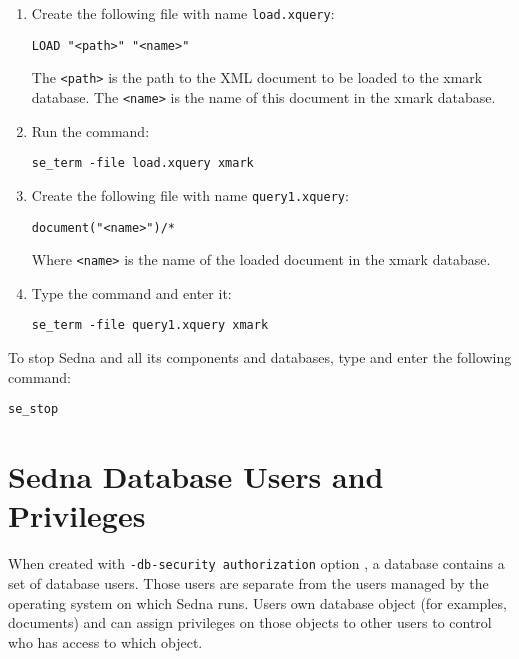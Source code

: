 \documentclass[a4paper,12pt]{article}
\begin{document}
\begin{enumerate}
\item Create the following file with name \verb!load.xquery!:

\begin{verbatim}
LOAD "<path>" "<name>"
\end{verbatim}

The \verb!<path>! is the path to the XML document to be loaded to the xmark database. The \verb!<name>! is the name of this document in the xmark database.

\item Run the command:

\begin{verbatim}
se_term -file load.xquery xmark
\end{verbatim}

\item Create the following file with name \verb!query1.xquery!:

\begin{verbatim}
document("<name>")/*
\end{verbatim}

Where \verb!<name>! is the name of the loaded document in the xmark database.

\item Type the command and enter it:
\begin{verbatim}
se_term -file query1.xquery xmark
\end{verbatim}
\end{enumerate}

To stop Sedna and all its components and databases, type and enter the following command:

\begin{verbatim}
se_stop
\end{verbatim}



%
%
%
%
\section{Sedna Database Users and Privileges}

When created with \verb!-db-security authorization! option , a database contains a set of database users. Those users are separate from the users managed by the operating system on which Sedna runs. Users own database object (for examples, documents) and can assign privileges on those objects to other users to control who has access to which object.
\end{document}
